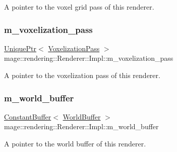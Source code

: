A pointer to the voxel grid pass of this renderer. \mbox{\label{classmage_1_1rendering_1_1_renderer_1_1_impl_a1701b11fe9fe100a033920b6e8617adb}} 
\subsubsection{\texorpdfstring{m\+\_\+voxelization\+\_\+pass}{m\_voxelization\_pass}}
{\footnotesize\ttfamily \mbox{\hyperlink{namespacemage_a3316d7143a973e37adf1110f2e80ca31}{Unique\+Ptr}}$<$ \mbox{\hyperlink{classmage_1_1rendering_1_1_voxelization_pass}{Voxelization\+Pass}} $>$ mage\+::rendering\+::\+Renderer\+::\+Impl\+::m\+\_\+voxelization\+\_\+pass\hspace{0.3cm}{\ttfamily [private]}}

A pointer to the voxelization pass of this renderer. \mbox{\label{classmage_1_1rendering_1_1_renderer_1_1_impl_ab108fbff123947defcc47f8cf53425e0}} 
\subsubsection{\texorpdfstring{m\+\_\+world\+\_\+buffer}{m\_world\_buffer}}
{\footnotesize\ttfamily \mbox{\hyperlink{classmage_1_1rendering_1_1_constant_buffer}{Constant\+Buffer}}$<$ \mbox{\hyperlink{structmage_1_1rendering_1_1_world_buffer}{World\+Buffer}} $>$ mage\+::rendering\+::\+Renderer\+::\+Impl\+::m\+\_\+world\+\_\+buffer\hspace{0.3cm}{\ttfamily [private]}}

A pointer to the world buffer of this renderer. 